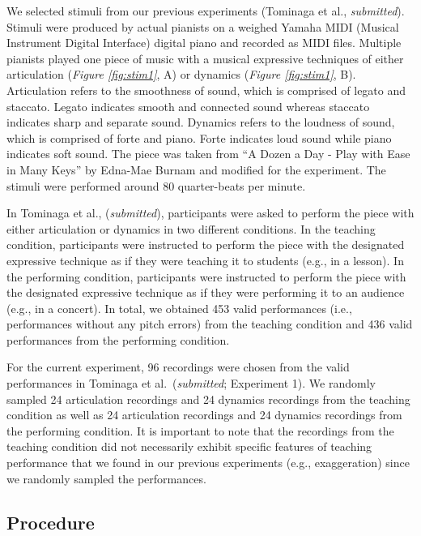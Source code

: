 \documentclass[
  man,floatsintext]{apa6}
\begin{document}
We selected stimuli from our previous experiments (Tominaga et al., \emph{submitted}). Stimuli were produced by actual pianists on a weighed Yamaha MIDI (Musical Instrument Digital Interface) digital piano and recorded as MIDI files. Multiple pianists played one piece of music with a musical expressive techniques of either articulation (\emph{Figure \ref{fig:stim1}}, A) or dynamics (\emph{Figure \ref{fig:stim1}}, B). Articulation refers to the smoothness of sound, which is comprised of legato and staccato. Legato indicates smooth and connected sound whereas staccato indicates sharp and separate sound. Dynamics refers to the loudness of sound, which is comprised of forte and piano. Forte indicates loud sound while piano indicates soft sound. The piece was taken from ``A Dozen a Day - Play with Ease in Many Keys'' by Edna-Mae Burnam and modified for the experiment. The stimuli were performed around 80 quarter-beats per minute.

In Tominaga et al., (\emph{submitted}), participants were asked to perform the piece with either articulation or dynamics in two different conditions. In the teaching condition, participants were instructed to perform the piece with the designated expressive technique as if they were teaching it to students (e.g., in a lesson). In the performing condition, participants were instructed to perform the piece with the designated expressive technique as if they were performing it to an audience (e.g., in a concert). In total, we obtained 453 valid performances (i.e., performances without any pitch errors) from the teaching condition and 436 valid performances from the performing condition.

For the current experiment, 96 recordings were chosen from the valid performances in Tominaga et al.~(\emph{submitted}; Experiment 1). We randomly sampled 24 articulation recordings and 24 dynamics recordings from the teaching condition as well as 24 articulation recordings and 24 dynamics recordings from the performing condition. It is important to note that the recordings from the teaching condition did not necessarily exhibit specific features of teaching performance that we found in our previous experiments (e.g., exaggeration) since we randomly sampled the performances.

\hypertarget{procedure}{%
\subsection{Procedure}\label{procedure}}
\end{document}
